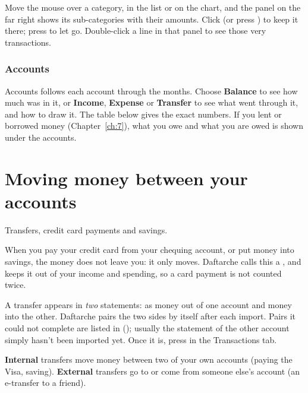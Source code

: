 \documentclass[11pt]{article}
\begin{document}
\begin{tip}
Move the mouse over a category, in the list or on the chart, and the panel on the far right shows
its sub-categories with their amounts. Click (or press ) to keep it there; press
 to let go. Double-click a line in that panel to see those very transactions.
\end{tip}

\subsection{Accounts}

Accounts follows each account through the months. Choose \textbf{Balance} to see how much was in it,
or \textbf{Income}, \textbf{Expense} or \textbf{Transfer} to see what went through it, and how to draw it.
The table below gives the exact numbers. If you lent or borrowed money (Chapter~\ref{ch:7}), what
you owe and what you are owed is shown under the accounts.

\chapter{Moving money between your accounts}{Transfers, credit card payments and savings.}\label{ch:6}

When you pay your credit card from your chequing account, or put money into savings, the money
does not leave you: it only moves. Daftarche calls this a \transfer, and keeps it out of your
income and spending, so a card payment is not counted twice.

A transfer appears in \emph{two} statements: as money out of one account and money into the other.
Daftarche pairs the two sides by itself after each import. Pairs it could not complete are listed in
 (); usually the statement of the other
account simply hasn't been imported yet. Once it is, press  in the
Transactions tab.

\begin{inshort}
\textbf{Internal} transfers move money between two of your own accounts (paying the Visa, saving).
\textbf{External} transfers go to or come from someone else's account (an e-transfer to a friend).
\end{inshort}
\end{document}
